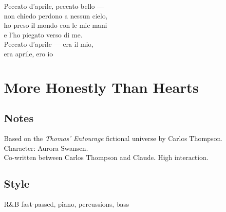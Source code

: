 \begin{lyrics}
Peccato d'aprile, peccato bello —\\
non chiedo perdono a nessun cielo,\\
ho preso il mondo con le mie mani\\
e l'ho piegato verso di me.\\
Peccato d'aprile — era il mio,\\
era aprile, ero io

\end{lyrics}

\section{More Honestly Than Hearts}

\subsection{Notes}
Based on the \emph{Thomas' Entourage} fictional universe by Carlos Thompson.\\
Character: Aurora Swansen.\\
Co-written between Carlos Thompson and Claude. High interaction.

\subsection{Style}
R\&B fast-passed, piano, percussions, bass

